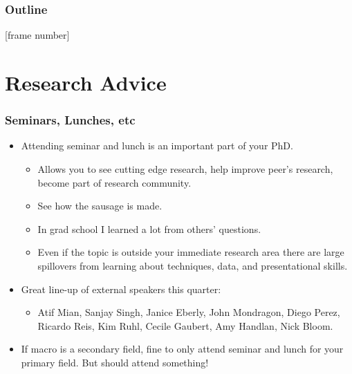 \documentclass[english,xcolor=svgnames]{beamer}
\begin{document}




\begin{frame}
\frametitle{Outline}   
\tableofcontents[hideallsubsections] 
\end{frame}
\addtocounter{framenumber}{-1}
[frame number]{}


\section{Research Advice}

\begin{frame}
\frametitle[alignment=center]{Seminars, Lunches, etc}
\begin{itemize}
	\item Attending seminar and lunch is an important part of your PhD.
	\begin{itemize}
		\item Allows you to see cutting edge research, help improve peer's research, become part of research community.
		\item See how the sausage is made.
		\item In grad school I learned a lot from others' questions.
		\item Even if the topic is outside your immediate research area there are large spillovers from learning about techniques, data, and presentational skills.
	\end{itemize}
	\item Great line-up of external speakers this quarter:
	\begin{itemize}
		\item Atif Mian, Sanjay Singh, Janice Eberly, John Mondragon, Diego Perez, Ricardo Reis, Kim Ruhl, Cecile Gaubert, Amy Handlan, Nick Bloom.
	\end{itemize}
	\item If macro is a secondary field, fine to only attend seminar and lunch for your primary field. But should attend something!
\end{itemize}
\end{frame}
\end{document}
